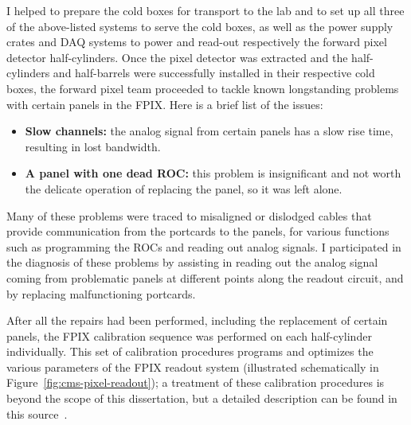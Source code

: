 I helped to prepare the cold boxes for transport to the lab and to set up all three of the above-listed systems to serve the cold boxes, as well as the power supply crates and DAQ systems to power and read-out respectively the forward pixel detector half-cylinders. Once the pixel detector was extracted and the half-cylinders and half-barrels were successfully installed in their respective cold boxes, the forward pixel team proceeded to tackle known longstanding problems with certain panels in the FPIX. Here is a brief list of the issues:

\begin{itemize}
\item \textbf{Slow channels:} the analog signal from certain panels has a slow rise time, resulting in lost bandwidth.
\item \textbf{A panel with one dead ROC:} this problem is insignificant and not worth the delicate operation of replacing the panel, so it was left alone.
\end{itemize}

Many of these problems were traced to misaligned or dislodged cables that provide communication from the portcards to the panels, for various functions such as programming the ROCs and reading out analog signals. I participated in the diagnosis of these problems by assisting in reading out the analog signal coming from problematic panels at different points along the readout circuit, and by replacing malfunctioning portcards.

After all the repairs had been performed, including the replacement of certain panels, the FPIX calibration sequence was performed on each half-cylinder individually. This set of calibration procedures programs and optimizes the various parameters of the FPIX readout system (illustrated schematically in Figure~\ref{fig:cms-pixel-readout}); a treatment of these calibration procedures is beyond the scope of this dissertation, but a detailed description can be found in this source~\cite{CMS-pixel-calibrations}.

